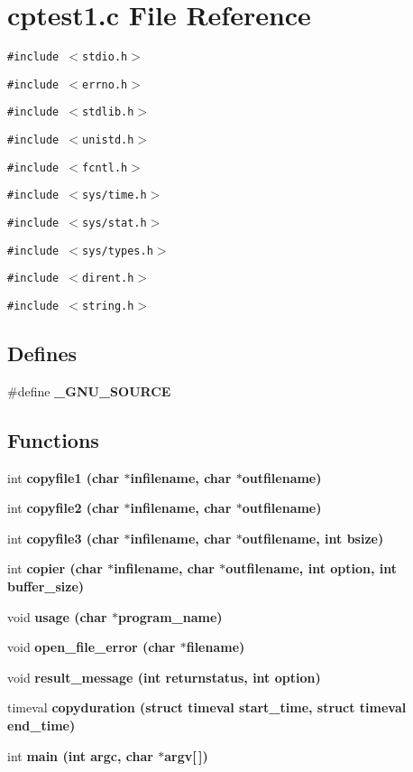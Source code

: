 \section{cptest1.c File Reference}
\label{cptest1_8c}
{\tt \#include $<$stdio.h$>$}\par
{\tt \#include $<$errno.h$>$}\par
{\tt \#include $<$stdlib.h$>$}\par
{\tt \#include $<$unistd.h$>$}\par
{\tt \#include $<$fcntl.h$>$}\par
{\tt \#include $<$sys/time.h$>$}\par
{\tt \#include $<$sys/stat.h$>$}\par
{\tt \#include $<$sys/types.h$>$}\par
{\tt \#include $<$dirent.h$>$}\par
{\tt \#include $<$string.h$>$}\par
\subsection*{Defines}
\begin{CompactItemize}
\item 
\#define \bf{\_\-GNU\_\-SOURCE}
\end{CompactItemize}
\subsection*{Functions}
\begin{CompactItemize}
\item 
int \bf{copyfile1} (char $\ast$infilename, char $\ast$outfilename)
\item 
int \bf{copyfile2} (char $\ast$infilename, char $\ast$outfilename)
\item 
int \bf{copyfile3} (char $\ast$infilename, char $\ast$outfilename, int bsize)
\item 
int \bf{copier} (char $\ast$infilename, char $\ast$outfilename, int option, int buffer\_\-size)
\item 
void \bf{usage} (char $\ast$program\_\-name)
\item 
void \bf{open\_\-file\_\-error} (char $\ast$filename)
\item 
void \bf{result\_\-message} (int returnstatus, int option)
\item 
timeval \bf{copyduration} (struct timeval start\_\-time, struct timeval end\_\-time)
\item 
int \bf{main} (int argc, char $\ast$argv[$\,$])
\end{CompactItemize}


